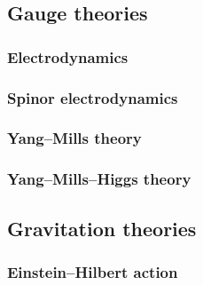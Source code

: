 \documentclass[a4paper,10pt]{article}
\begin{document}
\subsection{Gauge theories}

\subsubsection{Electrodynamics}

\subsubsection{Spinor electrodynamics}

\subsubsection{Yang--Mills theory}

\subsubsection{Yang--Mills--Higgs theory}

\subsection{Gravitation theories}

\subsubsection{Einstein--Hilbert action}



\printbibliography
\end{document}
